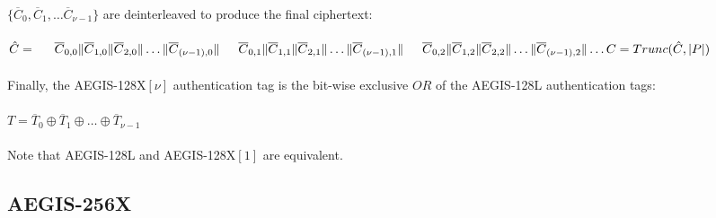 \documentclass[envcountsame,runningheads,notitlepage]{llncs}
\begin{document}
\paragraph{}

$\{ \overline{C}_0, \overline{C}_1, \ldots \overline{C}_{\nu-1} \}$ are deinterleaved to produce the final ciphertext:

\paragraph{}

\begin{math}
  \hat{C} = \\
  \indent \overline{C}_{0,0} \| \overline{C}_{1,0} \| \overline{C}_{2,0} \| \ldots \| \overline{C}_{(\nu-1),0} \| \\
  \indent \overline{C}_{0,1} \| \overline{C}_{1,1} \| \overline{C}_{2,1} \| \ldots \| \overline{C}_{(\nu-1),1} \| \\
  \indent \overline{C}_{0,2} \| \overline{C}_{1,2} \| \overline{C}_{2,2} \| \ldots \| \overline{C}_{(\nu-1),2} \| \ldots \\
  \\
  C = Trunc(\hat{C}, \lvert P \rvert)
\end{math}

\paragraph{}

Finally, the AEGIS-128X$[\nu]$ authentication tag is the bit-wise exclusive $OR$ of the AEGIS-128L authentication tags:

\paragraph{}

\begin{math}
  T = \overline{T}_0 \oplus \overline{T}_1 \oplus \ldots \oplus \overline{T}_{\nu-1}
\end{math}

\paragraph{}

Note that AEGIS-128L and AEGIS-128X$[1]$ are equivalent.

\subsection{AEGIS-256X}
\end{document}
